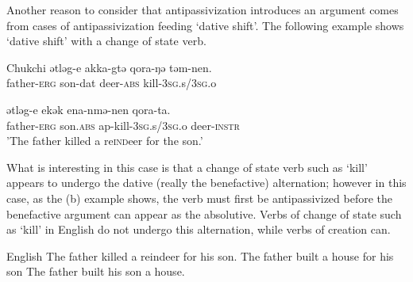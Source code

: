 \documentclass[output=paper,modfonts,nonflat,newtxmath]{langsci/langscibook}
\begin{document}
Another reason to consider that antipassivization introduces an argument comes from cases of antipassivization feeding ‘dative shift’. The following example shows ‘dative shift’ with a change of state verb.

\ea%
    Chukchi \citep{Spencer1995}\label{ex:basilico:13}
    \ea \label{ex:basilico:13a}
    \gll ǝtlǝg-e  akka-gtǝ  qora-ŋǝ  tǝm-nen.\\
    father{}-\textsc{erg}  son{}-dat  deer{}-\textsc{abs}  kill-\textsc{3sg}.s/\textsc{3sg}.o\\
    \glt
    
    \ex \label{ex:basilico:13b}
    \gll ǝtlǝg-e  ekǝk    ena-nmǝ-nen    qora-ta. \\
    father-\textsc{erg}  son.\textsc{abs}  ap{}-kill-\textsc{3sg}.s/\textsc{3sg}.o  deer-\textsc{instr}\\
    \glt 'The father killed a re\textsc{ind}eer for the son.'
    \z
    \z


What is interesting in this case is that a change of state verb such as ‘kill’ appears to undergo the dative (really the benefactive) alternation; however in this case, as the (b) example shows, the verb must first be antipassivized before the benefactive argument can appear as the absolutive. Verbs of change of state such as ‘kill’ in English do not undergo this alternation, while verbs of creation can.

\ea%
    English\label{ex:basilico:14}
    \ea The father killed a reindeer for his son.
   	\ex The father built a house for his son
   	\ex The father built his son a house.
    \z
    \z
\end{document}
